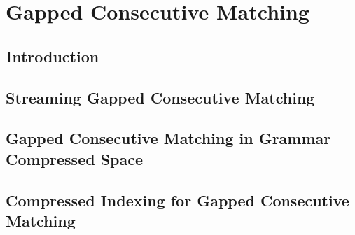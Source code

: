 \part{Gapped Consecutive Matching}
\clearemptydoublepage
\mainmatter

\chapter*{Introduction}

\chapter{Streaming Gapped Consecutive Matching}
\chapter{Gapped Consecutive Matching in Grammar Compressed Space}
\chapter{Compressed Indexing for Gapped Consecutive Matching}